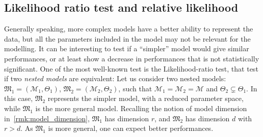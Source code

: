 \documentclass[../../Main_ManuscritThese.tex]{subfiles}
\begin{document}
\subsection{Likelihood ratio test and relative likelihood}
\label{sec:likelihood_ratio_test}
Generally speaking, more complex models have a better ability to represent the data, but all the parameters included in the model may not be relevant for the modelling. It can be interesting to test if a ``simpler'' model would give similar performances, or at least show a decrease in performances that is not statistically significant.
One of the most well-known test is the Likelihood-ratio test, that test if two \emph{nested models} are equivalent:
Let us consider two nested models: $\mathfrak{M}_1 = (\mathcal{M}_1, \Theta_1)$, $\mathfrak{M}_2= (\mathcal{M}_2,\Theta_2)$, such that $\mathcal{M}_1=\mathcal{M}_2=\mathcal{M}$ and $\Theta_2 \subsetneq \Theta_1$. In this case, $\mathfrak{M}_2$ represents the simpler model, with a reduced parameter space, while $\mathfrak{M}_1$ is the more general model. Recalling the notion of model dimension in~\cref{rmk:model_dimension},  $\mathfrak{M}_1$ has dimension $r$, and $\mathfrak{M}_2$ has dimension $d$ with $r>d$.
As $\mathfrak{M}_1$ is more general, one can expect better performances.
\end{document}
